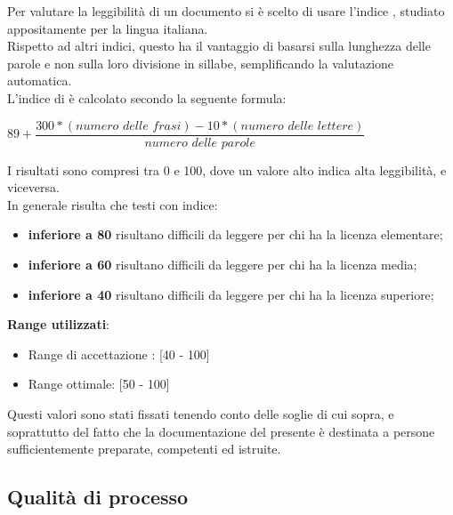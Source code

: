 Per valutare la leggibilità di un documento si è scelto di usare l'indice , studiato appositamente per la lingua italiana.\\
Rispetto ad altri indici, questo ha il vantaggio di basarsi sulla lunghezza delle parole e non sulla loro divisione in sillabe, semplificando la valutazione automatica.\\
L'indice di  è calcolato secondo la seguente formula:
\begin{center}
\begin{math}
	89 + 
		\dfrac	{300 * (\textit{numero delle frasi}) - 10 * (\textit{numero delle lettere})}
				{\textit{numero delle parole}}
\end{math}
\end{center}
I risultati sono compresi tra 0 e 100, dove un valore alto indica alta leggibilità, e viceversa. \\
In generale risulta che testi con indice:
\begin{itemize}
	\item \textbf{inferiore a 80} risultano difficili da leggere per chi ha la licenza elementare;
	\item \textbf{inferiore a 60} risultano difficili da leggere per chi ha la licenza media;
	\item \textbf{inferiore a 40} risultano difficili da leggere per chi ha la licenza superiore;
\end{itemize}
\textbf{Range utilizzati}:
\begin{itemize}
	\item Range di accettazione : [40 - 100]
	\item Range ottimale: [50 - 100]
\end{itemize}
Questi valori sono stati fissati tenendo conto delle soglie di cui sopra, e soprattutto del fatto che la documentazione del presente  è destinata a persone sufficientemente preparate, competenti ed istruite.



\subsection{Qualità di processo}
